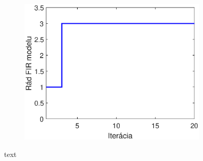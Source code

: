 \begin{figure}
\begin{subfigure}[b]{0.49\textwidth}
		\includegraphics[width=\linewidth]{images/hybrid_bio_order}
		\caption{}
		\label{fig:hybrid_bio_order}
	\end{subfigure}
	\caption{text}
	\label{fig:hybrid_bio_opt_results}	
\end{figure}

